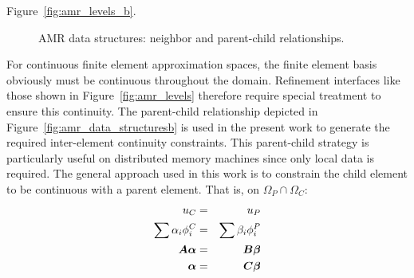 Figure~\ref{fig:amr_levels_b}.
\begin{figure}[htp]
  \centering
  \hspace{1em}
  \caption{AMR data structures: neighbor and parent-child relationships.}
  \label{fig:amr_data_structures}
\end{figure}

For continuous finite element approximation spaces, the finite element
basis obviously must be continuous throughout the domain.  Refinement
interfaces like those shown in Figure~\ref{fig:amr_levels} therefore
require special treatment to ensure this continuity.  The parent-child
relationship depicted in Figure~\ref{fig:amr_data_structuresb} is used
in the present work to generate the required inter-element continuity
constraints. This parent-child strategy is particularly useful on
distributed memory machines since only local data is required.  The
general approach used in this work is to constrain the child element
to be continuous with a parent element.  That is, on $\Omega_P \cap
\Omega_C$:
\begin{eqnarray}
  u_C &=& u_P \nonumber \\
  \sum \alpha_i \phi_i^C &=& \sum \beta_i \phi_i^P \nonumber \\
  {\boldsymbol{A}} {\boldsymbol{\alpha}} &=& {\boldsymbol{B}} {\boldsymbol{\beta}} \nonumber \\
  {\boldsymbol{\alpha}} &=& {\boldsymbol{C}} {\boldsymbol{\beta}} \nonumber
\end{eqnarray}

